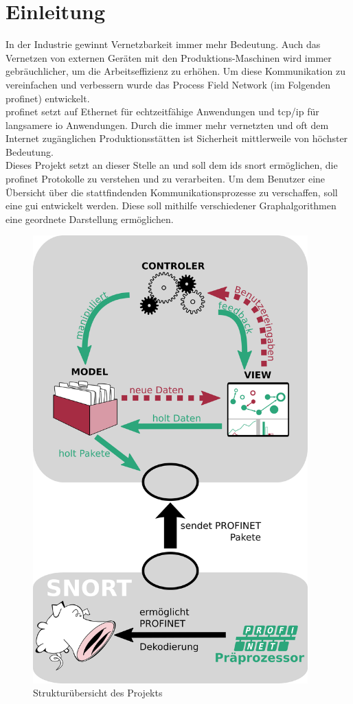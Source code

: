 \chapter*{Einleitung}

In der Industrie gewinnt Vernetzbarkeit immer mehr Bedeutung. Auch das Vernetzen von externen Geräten mit den Produktions-Maschinen wird immer gebräuchlicher, um die Arbeitseffizienz zu erhöhen. Um diese Kommunikation zu vereinfachen und verbessern wurde das Process Field Network (im Folgenden \gls{profinet}) entwickelt.\\
\gls{profinet} setzt auf Ethernet für echtzeitfähige Anwendungen und \gls{tcp}/\gls{ip} für langsamere \gls{io} Anwendungen. Durch die immer mehr vernetzten und oft dem Internet zugänglichen Produktionsstätten ist Sicherheit mittlerweile von höchster Bedeutung. \\
Dieses Projekt setzt an dieser Stelle an und soll dem \gls{ids} \gls{snort} ermöglichen, die \gls{profinet} Protokolle zu verstehen und zu verarbeiten. Um dem Benutzer eine Übersicht über die stattfindenden Kommunikationsprozesse zu verschaffen, soll eine \gls{gui} entwickelt werden. Diese soll mithilfe verschiedener Graphalgorithmen eine geordnete Darstellung ermöglichen.\\

\begin{figure}[H]
  \centering
  \includegraphics[width=300pt]{../diagrams/intro_diagram/intro_diagram.png}
  \caption{Strukturübersicht des Projekts}\label{fig:diagram}
\end{figure}

